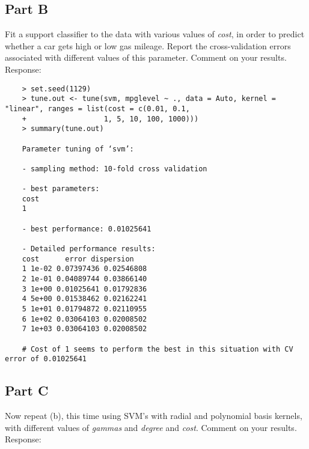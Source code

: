\documentclass{article}
\begin{document}
	\subsection{Part B}
Fit a support classifier to the data with various values of \textit{cost}, in order to predict whether a car gets high or low gas mileage. Report the cross-validation errors associated with different values of this parameter. Comment on your results. \\

Response:

\begin{verbatim}
	> set.seed(1129)
	> tune.out <- tune(svm, mpglevel ~ ., data = Auto, kernel = "linear", ranges = list(cost = c(0.01, 0.1, 
	+                  1, 5, 10, 100, 1000)))
	> summary(tune.out)
	
	Parameter tuning of ‘svm’:
	
	- sampling method: 10-fold cross validation 
	
	- best parameters:
	cost
	1
	
	- best performance: 0.01025641 
	
	- Detailed performance results:
	cost      error dispersion
	1 1e-02 0.07397436 0.02546808
	2 1e-01 0.04089744 0.03866140
	3 1e+00 0.01025641 0.01792836
	4 5e+00 0.01538462 0.02162241
	5 1e+01 0.01794872 0.02110955
	6 1e+02 0.03064103 0.02008502
	7 1e+03 0.03064103 0.02008502
	
	# Cost of 1 seems to perform the best in this situation with CV error of 0.01025641
\end{verbatim}

\break

	\subsection{Part C}
Now repeat (b), this time using SVM's with radial and polynomial basis kernels, with different values of \textit{gammas} and \textit{degree} and \textit{cost}. Comment on your results. \\

Response:
\end{document}
